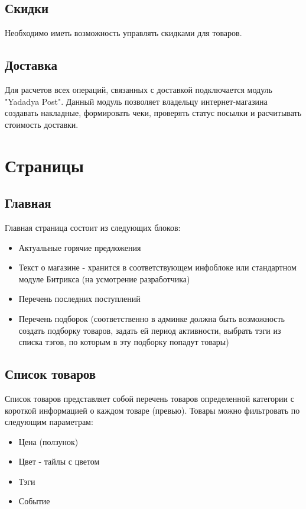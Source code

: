 \documentclass[DIV=calc, paper=a4, fontsize=11pt]{scrartcl} %
\begin{document}
\subsection{Скидки}
Необходимо иметь возможность управлять скидками для товаров. 

\subsection{Доставка}\label{subsec:delivery}
Для расчетов всех операций, связанных с доставкой подключается модуль "Yadadya Post". Данный модуль позволяет владельцу интернет-магазина создавать накладные, формировать чеки, проверять статус посылки и расчитывать стоимость доставки.

\section{Страницы}

\subsection{Главная}
Главная страница состоит из следующих блоков:
\begin{itemize}
	\item Актуальные горячие предложения
	\item Текст о магазине - хранится в соответствующем инфоблоке или стандартном модуле Битрикса (на усмотрение разработчика)
	\item Перечень последних поступлений
	\item Перечень подборок (соответственно в админке должна быть возможность создать подборку товаров, задать ей период активности, выбрать тэги из списка тэгов, по которым в эту подборку попадут товары)
\end{itemize}

\subsection{Список товаров}
Список товаров представляет собой перечень товаров определенной категории с короткой информацией о каждом товаре (превью). Товары можно фильтровать по следующим параметрам:

\begin{itemize}
	\item Цена (ползунок)
	\item Цвет - тайлы с цветом
	\item Тэги
	\item Событие
\end{itemize}
\end{document}
